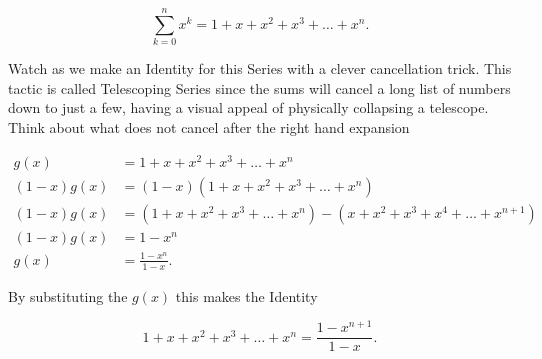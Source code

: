 \documentclass[12pt]{article}
\begin{document}
\begin{equation}
    \sum_{k=0}^n x^k=1+x+x^2+x^3+\ldots+x^n.
\end{equation}

Watch as we make an Identity for this Series with a clever cancellation trick. This tactic is called Telescoping Series since the sums will cancel a long list of numbers down to just a few, having a visual appeal of physically collapsing a telescope. Think about what does not cancel after the right hand expansion

\begin{align*}
    g(x) &=1+x+x^2+x^3+\ldots+x^n \\
    (1-x)g(x) &= (1-x)(1+x+x^2+x^3+\ldots+x^n) \\
    (1-x)g(x) &= (1+x+x^2+x^3+\ldots+x^n)-(x+x^2+x^3+x^4+\ldots+x^{n+1}) \\
    (1-x)g(x) &= 1-x^n \\
    g(x) &= \frac{1-x^n}{1-x}.
\end{align*}

By substituting the $g(x)$ this makes the Identity 

\begin{equation*}
    1+x+x^2+x^3+\ldots+x^n=\frac{1-x^{n+1}}{1-x}.
\end{equation*}
\end{document}
